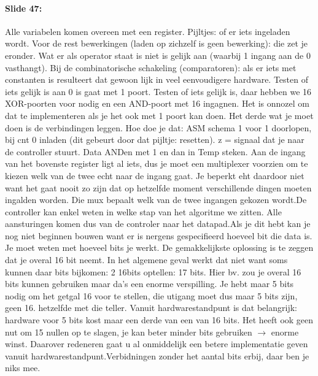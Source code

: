 \documentclass[10pt,a4paper]{book}
\begin{document}
\paragraph{Slide 47:} Alle variabelen komen overeen met een register. Pijltjes: of er iets ingeladen wordt. Voor de rest bewerkingen (laden op zichzelf is geen bewerking): die zet je eronder. Wat er als operator staat is niet is gelijk aan (waarbij 1 ingang aan de 0 vasthangt). Bij de combinatorische schakeling (comparatoren): als er iets met constanten is resulteert dat gewoon lijk in veel eenvoudigere hardware. Testen of iets gelijk is aan 0 is gaat met 1 poort. Testen of iets gelijk is, daar hebben we 16 XOR-poorten voor nodig en een AND-poort met 16 ingagnen. Het is onnozel om dat te implementeren als je het ook met 1 poort kan doen. Het derde wat je moet doen is de verbindingen leggen. Hoe doe je dat: ASM schema 1 voor 1 doorlopen, bij cnt 0 inladen (dit gebeurt door dat pijltje: resetten). z = signaal dat je naar de controller stuurt. Data ANDen met 1 en dan in Temp steken. Aan de ingang van het bovenste register ligt al iets, dus je moet een multiplexer voorzien om te kiezen welk van de twee echt naar de ingang gaat. Je beperkt eht daardoor niet want het gaat nooit zo zijn dat op hetzelfde moment verschillende dingen moeten ingalden worden. Die mux bepaalt welk van de twee ingangen gekozen wordt.De controller kan enkel weten in welke stap van het algoritme we zitten. Alle aansturingen komen dus van de controler naar het datapad.Als je dit hebt kan je nog niet beginnen bouwen want er is nergens gespecifieerd hoeveel bit die data is. Je moet weten met hoeveel bits je werkt. De gemakkelijkste oplossing is te zeggen dat je overal 16 bit neemt. In het algemene geval werkt dat niet want soms kunnen daar bits bijkomen: 2 16bits optellen: 17 bits. Hier bv. zou je overal 16 bits kunnen gebruiken maar da's een enorme verspilling. Je hebt maar 5 bits nodig om het getgal 16 voor te stellen, die utigang moet dus maar 5 bits zijn, geen 16. hetzelfde met die teller. Vanuit hardwarestandpunt is dat belangrijk: hardware voor 5 bits kost maar een derde van een van 16 bits. Het heeft ook geen nut om 15 nullen op te slagen, je kan beter minder bits gebruiken $\rightarrow$ enorme winst. Daarover redeneren gaat u al onmiddelijk een betere implementatie geven vanuit hardwarestandpunt.Verbidningen zonder het aantal bits erbij, daar ben je niks mee.
\end{document}
